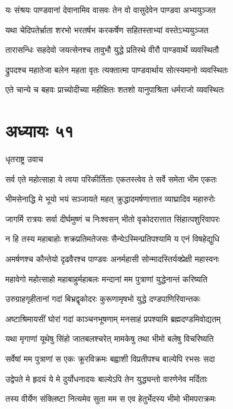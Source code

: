 \twolineshloka
{यः संश्रयः पाण्डवानां देवानामिव वासवः}
{तेन वो वासुदेवेन पाण्डवा अभ्ययुञ्जत}


\twolineshloka
{यथा चेदिपतेर्भ्राता शरभो भरतर्षभ}
{करकर्षेण सहितस्ताभ्यां वस्तेऽभ्ययुञ्जत}


\twolineshloka
{तारासन्धिः सहदेवो जयत्सेनश्च तावुभौ}
{युद्धे प्रतिरथे वीरौ पाण्डवार्थे व्यवस्थितौ}


\twolineshloka
{द्रुपदश्च महातेजा बलेन महता वृतः}
{त्यक्तात्मा पाण्डवार्थाय सोत्स्यमानो व्यवस्थितः}


\twolineshloka
{एते चान्ये च बहवः प्राच्योदीच्या महीक्षितः}
{शतशो यानुपाश्रिता धर्मराजो व्यवस्थितः}


\chapter{अध्यायः ५१}
\twolineshloka
{धृतराष्ट्र उवाच}
{}


\twolineshloka
{सर्व एते महोत्साहा ये त्वया परिकीर्तिताः}
{एकतस्त्वेव ते सर्वे समेता भीम एकतः}


\twolineshloka
{भीमसेनाद्धि मे भूयो भयं सञ्जायते महत्}
{क्रुद्धादमर्षणात्तात व्याघ्रादिव महारुरोः}


\twolineshloka
{जागर्मि रात्रयः सर्वा दीर्घमुष्णं च निःश्वसन्}
{भीतो वृकोदरात्तात सिंहात्पशुरिवापरः}


\twolineshloka
{न हि तस्य महाबाहोः शक्रप्रतिमतेजसः}
{सैन्येऽस्मिन्प्रतिपश्यामि य एनं विषहेद्युधि}


\twolineshloka
{अमर्षणश्च कौन्तेयो दृढवैरश्च पाण्डवः}
{अनर्महासी सोन्मादस्तिर्यक्प्रेक्षी महास्वनः}


\twolineshloka
{महावेगो महोत्साहो महाबाहुर्महाबलः}
{मन्दानां मम पुत्राणां युद्धेनान्तं करिष्यति}


\twolineshloka
{उरुग्राहगृहीतानां गदां बिभ्रद्वृकोदरः}
{कुरूणामृषभो युद्धे दण्डपाणिरिवान्तकः}


\twolineshloka
{अष्टाश्रिमायसीं घोरां गदां काञ्चनभूषणाम्}
{मनसाहं प्रपश्यामि ब्रह्मदण्डमिवोद्यतम्}


\twolineshloka
{यथा मृगाणां यूथेषु सिंहो जातबलश्चरेत्}
{मामकेषु तथा भीमो बलेषु विचरिष्यति}


\twolineshloka
{सर्वेषां मम पुत्राणां स एकः क्रूरविक्रमः}
{बह्वाशी विप्रतीपश्च बाल्येपि रभसः सदा}


\twolineshloka
{उद्वेपते मे हृदयं ये मे दुर्योधनादयः}
{बाल्येऽपि तेन युद्ध्यन्तो वारणेनेव मर्दिताः}


\twolineshloka
{तस्य वीर्येण संक्लिष्टा नित्यमेव सुता मम}
{स एव हेतुर्भेदस्य भीमो भीमपराक्रमः}



